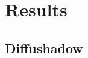 \documentclass[pdflatex,sn-nature]{sn-jnl}%
\theoremstyle{thmstyleone}%
\theoremstyle{thmstyletwo}%
\theoremstyle{thmstylethree}%
\begin{document}



\section{Results}\label{sec2}

\subsection{Diffushadow}

\end{document}
